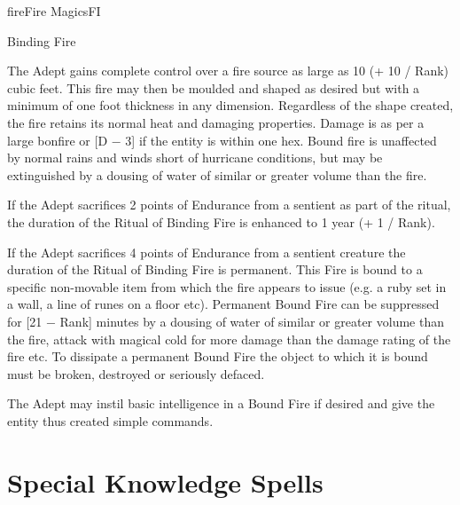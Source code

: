 \begin{College}[2.0]{fire}{Fire Magics}{FI}
\begin{ritual}[Q-1]{Binding Fire}
\begin{effects}
The Adept gains complete control over a fire source as large as 10 (+
10 / Rank) cubic feet.  This fire may then be moulded and shaped as
desired but with a minimum of one foot thickness in any dimension.
Regardless of the shape created, the fire retains its normal heat and
damaging properties. Damage is as per a large bonfire or [D − 3] if
the entity is within one hex.  Bound fire is unaffected by normal
rains and winds short of hurricane conditions, but may be extinguished
by a dousing of water of similar or greater volume than the fire.

If the Adept sacrifices 2 points of Endurance from a sentient as part
of the ritual, the duration of the Ritual of Binding Fire is enhanced
to 1 year (+ 1 / Rank).

If the Adept sacrifices 4 points of Endurance from a sentient creature
the duration of the Ritual of Binding Fire is permanent. This Fire is
bound to a specific non-movable item from which the fire appears to
issue (e.g. a ruby set in a wall, a line of runes on a floor etc).
Permanent Bound Fire can be suppressed for [21 − Rank] minutes by a
dousing of water of similar or greater volume than the fire, attack
with magical cold for more damage than the damage rating of the fire
etc. To dissipate a permanent Bound Fire the object to which it is
bound must be broken, destroyed or seriously defaced.

The Adept may instil basic intelligence in a Bound Fire if desired and
give the entity thus created simple commands.
\end{effects}
\end{ritual}


\section{Special Knowledge Spells}


\end{College}
